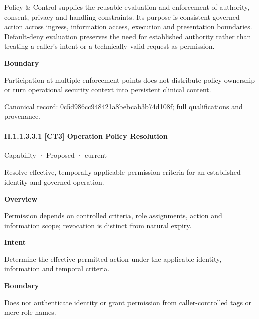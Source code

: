 Policy \& Control supplies the reusable evaluation and enforcement of authority, consent, privacy and handling constraints. Its purpose is consistent governed action across ingress, information access, execution and presentation boundaries. Default-deny evaluation preserves the need for established authority rather than treating a caller's intent or a technically valid request as permission.



\textbf{Boundary}



Participation at multiple enforcement points does not distribute policy ownership or turn operational security context into persistent clinical content.


{\footnotesize \href{../../../../continuum/strategy/capability/0c5d986cc948421a8bebcab3b74d108f.md}{Canonical record: 0c5d986cc948421a8bebcab3b74d108f}; full qualifications and provenance.}\par
\paragraph*{II.1.1.3.3.1 [CT3] Operation Policy Resolution}
\label{navigation:II.1.1.3.3.1}

\label{element:7eca9fc4d2244b0facc83376e57ebbc4}
{\small Capability · Proposed · current}\par

Resolve effective, temporally applicable permission criteria for an established identity and governed operation.



\textbf{Overview}



Permission depends on controlled criteria, role assignments, action and information scope; revocation is distinct from natural expiry.



\textbf{Intent}



Determine the effective permitted action under the applicable identity, information and temporal criteria.



\textbf{Boundary}



Does not authenticate identity or grant permission from caller-controlled tags or mere role names.


